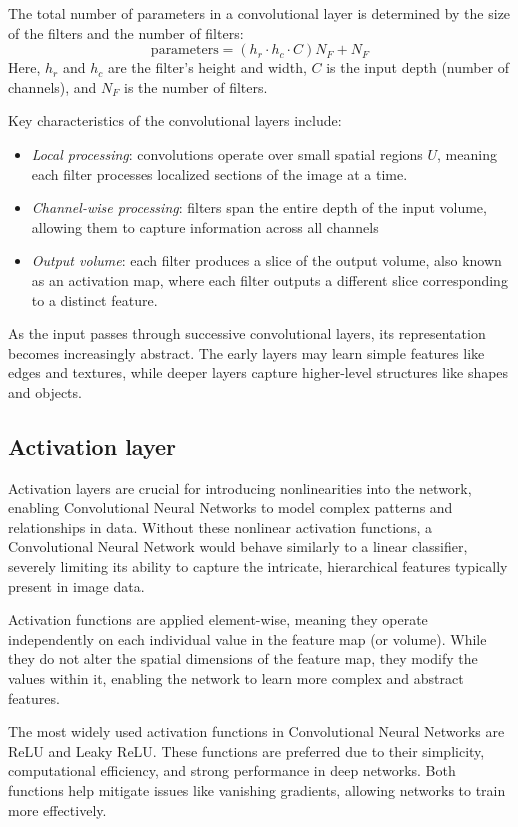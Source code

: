 The total number of parameters in a convolutional layer is determined by the size of the filters and the number of filters:
\[\text{parameters}=(h_r\cdot h_c\cdot C)N_F+N_F\]
Here, $h_r$ and $h_c$ are the filter's height and width, $C$  is the input depth (number of channels), and $N_F$ is the number of filters.

Key characteristics of the convolutional layers include:
\begin{itemize}
    \item \textit{Local processing}: convolutions operate over small spatial regions $U$, meaning each filter processes localized sections of the image at a time.
    \item \textit{Channel-wise processing}: filters span the entire depth of the input volume, allowing them to capture information across all channels
    \item \textit{Output volume}: each filter produces a slice of the output volume, also known as an activation map, where each filter outputs a different slice corresponding to a distinct feature.
\end{itemize}
As the input passes through successive convolutional layers, its representation becomes increasingly abstract. 
The early layers may learn simple features like edges and textures, while deeper layers capture higher-level structures like shapes and objects. 

\subsection{Activation layer}
Activation layers are crucial for introducing nonlinearities into the network, enabling Convolutional Neural Networks to model complex patterns and relationships in data.
Without these nonlinear activation functions, a Convolutional Neural Network would behave similarly to a linear classifier, severely limiting its ability to capture the intricate, hierarchical features typically present in image data.

Activation functions are applied element-wise, meaning they operate independently on each individual value in the feature map (or volume). 
While they do not alter the spatial dimensions of the feature map, they modify the values within it, enabling the network to learn more complex and abstract features.

The most widely used activation functions in Convolutional Neural Networks are ReLU and Leaky ReLU. 
These functions are preferred due to their simplicity, computational efficiency, and strong performance in deep networks. 
Both functions help mitigate issues like vanishing gradients, allowing networks to train more effectively.

